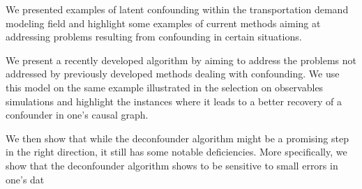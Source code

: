 We presented examples of latent confounding within the transportation demand modeling field and highlight 
some examples of current methods aiming at addressing problems resulting from confounding in certain situations.

We present a recently developed algorithm by \citet{wang_2019_blessings} aiming to address the problems not 
addressed by previously developed methods dealing with confounding. We use this model on the same example illustrated in
the selection on observables simulations and highlight the instances where it leads to a better recovery of 
a confounder in one's causal graph. 

We then show that while the deconfounder algorithm might be a promising step in the right direction, 
it still has some notable deficiencies. More specifically, we show that the deconfounder algorithm shows 
to be sensitive to small errors in one's dat